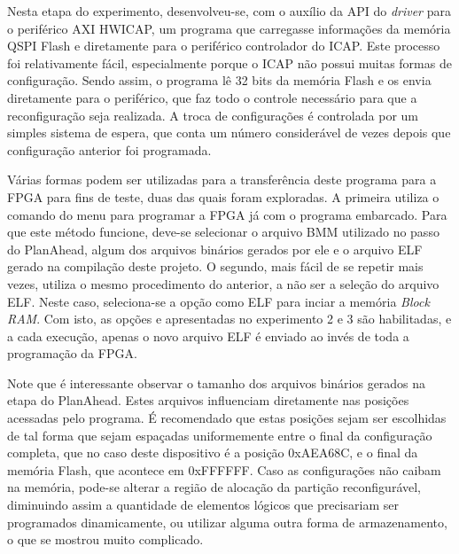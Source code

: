 \documentclass[11pt,a4paper,oneside]{book}
\begin{document}
Nesta etapa do experimento, desenvolveu-se, com o auxílio da API do \textit{driver} para o periférico AXI HWICAP, um programa que carregasse informações da memória QSPI Flash e diretamente para o periférico controlador do ICAP.
Este processo foi relativamente fácil, especialmente porque o ICAP não possui muitas formas de configuração.
Sendo assim, o programa lê 32 bits da memória Flash e os envia diretamente para o periférico, que faz todo o controle necessário para que a reconfiguração seja realizada.
A troca de configurações é controlada por um simples sistema de espera, que conta um número considerável de vezes depois que configuração anterior foi programada.

Várias formas podem ser utilizadas para a transferência deste programa para a FPGA para fins de teste, duas das quais foram exploradas.
A primeira utiliza o comando  do menu  para programar a FPGA já com o programa embarcado.
Para que este método funcione, deve-se selecionar o arquivo BMM utilizado no passo do PlanAhead, algum dos arquivos binários gerados por ele e o arquivo ELF gerado na compilação deste projeto.
O segundo, mais fácil de se repetir mais vezes, utiliza o mesmo procedimento do anterior, a não ser a seleção do arquivo ELF.
Neste caso, seleciona-se a opção  como ELF para inciar a memória \textit{Block RAM}.
Com isto, as opções  e  apresentadas no experimento 2 e 3 são habilitadas, e a cada execução, apenas o novo arquivo ELF é enviado ao invés de toda a programação da FPGA.

Note que é interessante observar o tamanho dos arquivos binários gerados na etapa do PlanAhead.
Estes arquivos influenciam diretamente nas posições acessadas pelo programa.
É recomendado que estas posições sejam ser escolhidas de tal forma que sejam espaçadas uniformemente entre o final da configuração completa, que no caso deste dispositivo é a posição 0xAEA68C, e o final da memória Flash, que acontece em 0xFFFFFF.
Caso as configurações não caibam na memória, pode-se alterar a região de alocação da partição reconfigurável, diminuindo assim a quantidade de elementos lógicos que precisariam ser programados dinamicamente, ou utilizar alguma outra forma de armazenamento, o que se mostrou muito complicado.
\end{document}
